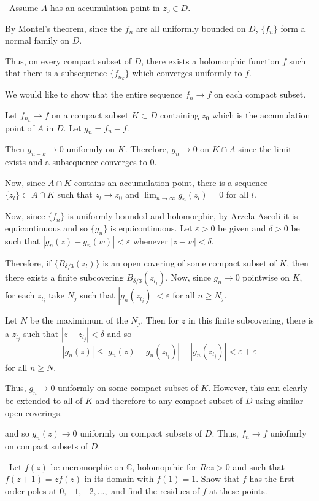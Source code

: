 \documentclass[12pt]{Homework}
\begin{document}
\begin{solution}$\,$
Assume $A$ has an accumulation point in $z_0\in D.$ 

By Montel's theorem, since the $f_n$ are all uniformly bounded on $D$, $\{f_n\}$ form a normal family on $D$.

Thus, on every compact subset of $D$, there exists a holomorphic function $f$ such that there is a subsequence $\{f_{n_k}\}$ which converges uniformly to $f.$

We would like to show that the entire sequence $f_n\to f$ on each compact subset. 

Let $f_{n_k}\to f$ on a compact subset $K\subset D$ containing $z_0$ which is the accumulation point of $A$ in $D$. Let $g_n=f_n-f$. 

Then $g_{n-k}\to0$ uniformly on $K.$ Therefore, $g_n\to 0$ on $K\cap A$ since the limit exists and a subsequence converges to $0$.

Now, since $A\cap K$ contains an accumulation point, there is a sequence $\{z_l\}\subset A\cap K$ such that $z_l\to z_0$ and $\lim_{n\to\infty}g_n(z_l)=0$ for all $l$. 

Now, since $\{f_n\}$ is uniformly bounded and holomorphic, by Arzela-Ascoli it is equicontinuous and so $\{g_n\}$ is equicontinuous. Let $\varepsilon>0$ be given and $\delta>0$ be such that $|g_n(z)-g_n(w)|<\varepsilon$ whenever $|z-w|<\delta.$

Therefore, if $\{B_{\delta/3}(z_l)\}$ is an open covering of some compact subset of $K$, then there exists a finite subcovering $B_{\delta/3}(z_{l_j})$. Now, since $g_n\to0$ pointwise on $K$, for each $z_{l_j}$ take $N_j$ such that $|g_n(z_{l_j})|<\varepsilon$ for all $n\ge N_j$.

Let $N$ be the maximimum of the $N_j$. Then for $z$ in this finite subcovering, there is a $z_{l_j}$ such that $|z-z_{l_j}|<\delta$ and so $$|g_n(z)|\le|g_n(z)-g_n(z_{l_j})|+|g_n(z_{l_j})|<\varepsilon+\varepsilon$$ for all $n\ge N$. 

Thus, $g_n\to0$ uniformly on some compact subset of $K.$ However, this can clearly be extended to all of $K$ and therefore to any compact subset of $D$ using similar open coverings.  

and so $g_n(z)\to0$ uniformly on compact subsets of $D$. Thus, $f_n\to f$ uniofmrly on compact subsets of $D.$
\end{solution}
\newpage





\begin{problem} $\,$
Let $f(z)$ be meromorphic on $\mathbb{C}$, holomoprhic for $Re z>0$ and such that $f(z+1)=zf(z)$ in its domain with $f(1)=1$. Show that $f$ has the first order poles at $0,-1,-2,...,$ and find the residues of $f$ at these points.
\end{problem}
\end{document}
